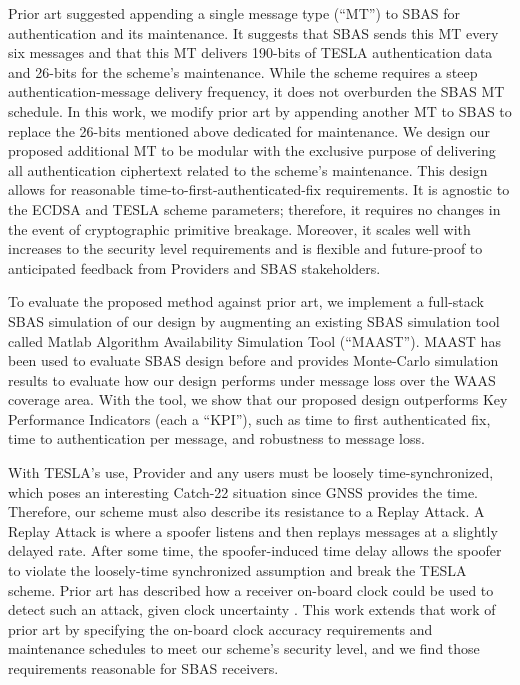 \documentclass[letterpaper,times]{IONconf/IONconf}
\begin{document}
Prior art suggested appending a single message type (``MT'') to SBAS for authentication and its maintenance\cite{Neish_Dissertation}.
It suggests that SBAS sends this MT every six messages and that this MT delivers 190-bits of TESLA authentication data and 26-bits for the scheme's maintenance.
While the scheme requires a steep authentication-message delivery frequency, it does not overburden the SBAS MT schedule.
In this work, we modify prior art by appending another MT to SBAS to replace the 26-bits mentioned above dedicated for maintenance.
We design our proposed additional MT to be modular with the exclusive purpose of delivering all authentication ciphertext related to the scheme's maintenance.
This design allows for reasonable time-to-first-authenticated-fix requirements.
It is agnostic to the ECDSA and TESLA scheme parameters; therefore, it requires no changes in the event of cryptographic primitive breakage.
Moreover, it scales well with increases to the security level requirements and is flexible and future-proof to anticipated feedback from Providers and SBAS stakeholders.

To evaluate the proposed method against prior art, we implement a full-stack SBAS simulation of our design by augmenting an existing SBAS simulation tool called Matlab Algorithm Availability Simulation Tool (``MAAST'')\cite{MAAST}.
MAAST has been used to evaluate SBAS design before and provides Monte-Carlo simulation results to evaluate how our design performs under message loss over the WAAS coverage area.
With the tool, we show that our proposed design outperforms Key Performance Indicators (each a ``KPI''), such as time to first authenticated fix, time to authentication per message, and robustness to message loss.

With TESLA's use, Provider and any users must be loosely time-synchronized, which poses an interesting Catch-22 situation since GNSS provides the time.
Therefore, our scheme must also describe its resistance to a Replay Attack.
A Replay Attack is where a spoofer listens and then replays messages at a slightly delayed rate.
After some time, the spoofer-induced time delay allows the spoofer to violate the loosely-time synchronized assumption and break the TESLA scheme.
Prior art has described how a receiver on-board clock could be used to detect such an attack, given clock uncertainty \cite{time_sync_paper}.
This work extends that work of prior art by specifying the on-board clock accuracy requirements and maintenance schedules to meet our scheme's security level, and we find those requirements reasonable for SBAS receivers.
\end{document}
